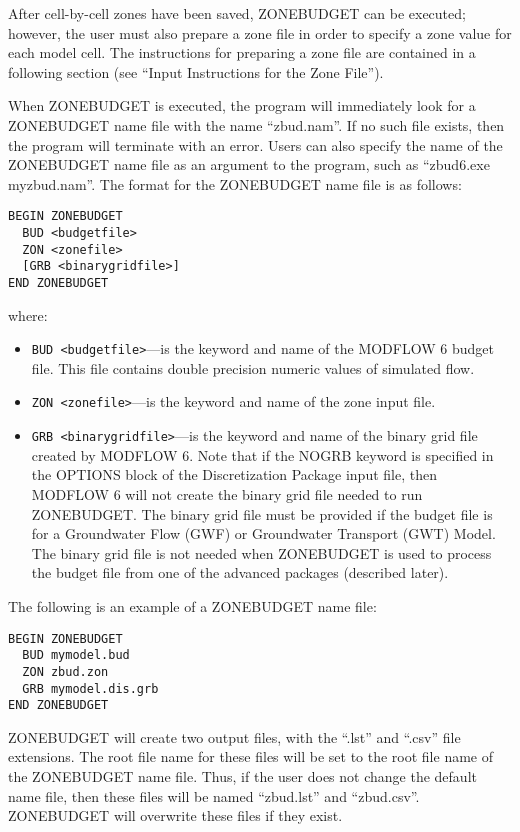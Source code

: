\documentclass[11pt,twoside,twocolumn]{usgsreport}
\begin{document}
After cell-by-cell zones have been saved, ZONEBUDGET can be executed; however, the user must also prepare a zone file in order to specify a zone value for each model cell. The instructions for preparing a zone file are contained in a following section (see ``Input Instructions for the Zone File'').

When ZONEBUDGET is executed, the program will immediately look for a ZONEBUDGET name file with the name ``zbud.nam''.  If no such file exists, then the program will terminate with an error.  Users can also specify the name of the ZONEBUDGET name file as an argument to the program, such as ``zbud6.exe myzbud.nam''.  The format for the ZONEBUDGET name file is as follows:

\begin{verbatim}
BEGIN ZONEBUDGET
  BUD <budgetfile>
  ZON <zonefile>
  [GRB <binarygridfile>]
END ZONEBUDGET
\end{verbatim}

where:

\begin{itemize}
\item \texttt{BUD <budgetfile>}---is the keyword and name of the MODFLOW 6 budget file.  This file contains double precision numeric values of simulated flow.
\item \texttt{ZON <zonefile>}---is the keyword and name of the zone input file.
\item \texttt{GRB <binarygridfile>}---is the keyword and name of the binary grid file created by MODFLOW 6.  Note that if the NOGRB keyword is specified in the OPTIONS block of the Discretization Package input file, then MODFLOW 6 will not create the binary grid file needed to run ZONEBUDGET.  The binary grid file must be provided if the budget file is for a Groundwater Flow (GWF) or Groundwater Transport (GWT) Model.  The binary grid file is not needed when ZONEBUDGET is used to process the budget file from one of the advanced packages (described later).
\end{itemize}

The following is an example of a ZONEBUDGET name file:

\begin{verbatim}
BEGIN ZONEBUDGET
  BUD mymodel.bud
  ZON zbud.zon
  GRB mymodel.dis.grb
END ZONEBUDGET
\end{verbatim}

ZONEBUDGET will create two output files, with the ``.lst'' and ``.csv'' file extensions.  The root file name for these files will be set to the root file name of the ZONEBUDGET name file. Thus, if the user does not change the default name file, then these files will be named ``zbud.lst'' and ``zbud.csv''.  ZONEBUDGET will overwrite these files if they exist.
\end{document}
